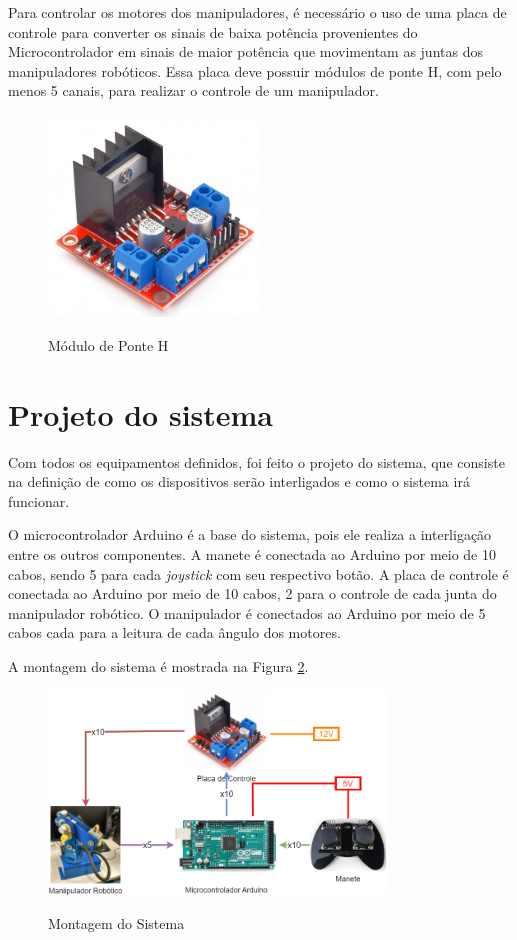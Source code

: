 Para controlar os motores dos manipuladores, é necessário o uso de uma placa de controle para converter os sinais de baixa potência provenientes do Microcontrolador em sinais de maior potência que movimentam as juntas dos manipuladores robóticos.
Essa placa deve possuir módulos de ponte H, com pelo menos 5 canais, para realizar o controle de um manipulador.

\begin{figure}[H]
    \centering
    \caption{Módulo de Ponte H}
    \includegraphics[keepaspectratio=true, width=0.5\textwidth]
    	{img/ponte-h.jpg}
    \label{fig:ponteH}
\end{figure}

\section[Projeto do sistema]{Projeto do sistema}

Com todos os equipamentos definidos, foi feito o projeto do sistema, que consiste na definição de como os dispositivos serão interligados e como o sistema irá funcionar.

O microcontrolador Arduino é a base do sistema, pois ele realiza a interligação entre os outros componentes.
A manete é conectada ao Arduino por meio de 10 cabos, sendo 5 para cada \textit{joystick} com seu respectivo botão.
A placa de controle é conectada ao Arduino por meio de 10 cabos, 2 para o controle de cada junta do manipulador robótico.
O manipulador é conectados ao Arduino por meio de 5 cabos cada para a leitura de cada ângulo dos motores.

A montagem do sistema é mostrada na Figura \ref{fig:montagemSistema}.

\begin{figure}[H]
    \centering
    \caption{Montagem do Sistema}
    \includegraphics[keepaspectratio=true, width=0.8\textwidth]
    	{img/montagem-sistema.png}
    \label{fig:montagemSistema}
\end{figure}


